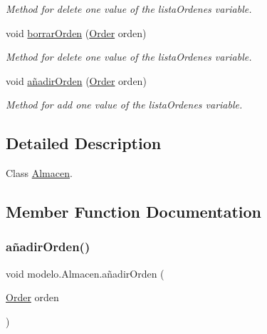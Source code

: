 \begin{DoxyCompactItemize}
\begin{DoxyCompactList}\small\item\em Method for delete one value of the lista\+Ordenes variable. \end{DoxyCompactList}\item 
void \mbox{\hyperlink{classmodelo_1_1_almacen_ac49185c9cee3416232e739b431cfc6fc}{borrar\+Orden}} (\mbox{\hyperlink{classmodelo_1_1_order}{Order}} orden)
\begin{DoxyCompactList}\small\item\em Method for delete one value of the lista\+Ordenes variable. \end{DoxyCompactList}\item 
void \mbox{\hyperlink{classmodelo_1_1_almacen_a457f2bdb82e217ddcbfa1cc5bccedff8}{añadir\+Orden}} (\mbox{\hyperlink{classmodelo_1_1_order}{Order}} orden)
\begin{DoxyCompactList}\small\item\em Method for add one value of the lista\+Ordenes variable. \end{DoxyCompactList}\end{DoxyCompactItemize}


\subsection{Detailed Description}
Class \mbox{\hyperlink{classmodelo_1_1_almacen}{Almacen}}. 

\subsection{Member Function Documentation}
\mbox{\label{classmodelo_1_1_almacen_a457f2bdb82e217ddcbfa1cc5bccedff8}} 
\subsubsection{\texorpdfstring{añadir\+Orden()}{añadirOrden()}}
{\footnotesize\ttfamily void modelo.\+Almacen.\+añadir\+Orden (\begin{DoxyParamCaption}\item[{\mbox{\hyperlink{classmodelo_1_1_order}{Order}}}]{orden }\end{DoxyParamCaption})}



